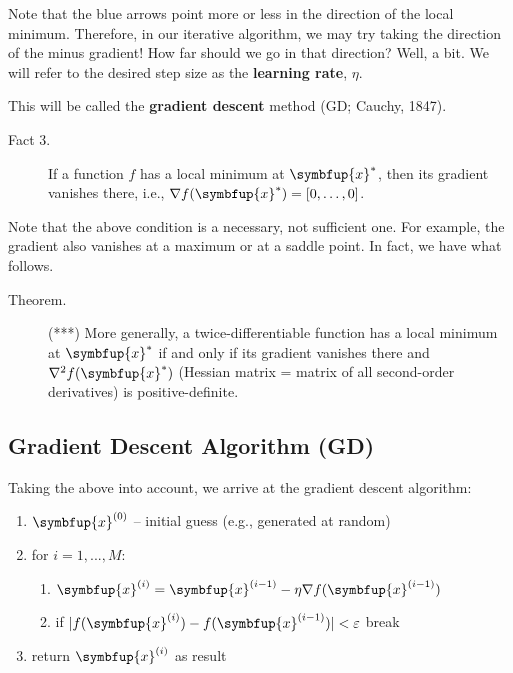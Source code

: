 \documentclass[10pt,b5paper,krantz1]{krantz}
\providecommand{\tightlist}{%
  \setlength{\itemsep}{0pt}\setlength{\parskip}{0pt}}
\renewcommand{\mathbf}[1]{\symbfup{#1}}
\begin{document}
Note that the blue arrows point more or less in the direction of the local minimum.
Therefore, in our iterative algorithm,
we may try taking the direction of the minus gradient!
How far should we go in that direction? Well, a bit.
We will refer to the desired step size as the \textbf{learning rate}, \(\eta\).

\bigskip

This will be called the \textbf{gradient descent} method (GD;
Cauchy, 1847).

\begin{description}
\item[Fact 3.]
If a function \(f\) has a local minimum at \(\mathbf{x}^*\),
then its gradient vanishes there, i.e.,
\(\nabla {f}(\mathbf{x}^*)=[0,\dots,0]\).
\end{description}

\bigskip

Note that the above condition is a necessary, not sufficient
one. For example, the gradient also vanishes at a maximum or
at a saddle point. In fact, we have what follows.

\begin{description}
\item[Theorem.]
(***) More generally, a twice-differentiable function
has a local minimum at \(\mathbf{x}^*\) if and only if
its gradient vanishes there and \(\nabla^2 {f}(\mathbf{x}^*)\)
(Hessian matrix = matrix of all second-order derivatives)
is positive-definite.
\end{description}

\hypertarget{gradient-descent-algorithm-gd}{%
\subsection{Gradient Descent Algorithm (GD)}\label{gradient-descent-algorithm-gd}}

Taking the above into account, we arrive at the gradient descent algorithm:

\begin{enumerate}
\def\labelenumi{\arabic{enumi}.}
\item
  \(\mathbf{x}^{(0)}\) -- initial guess (e.g., generated at random)
\item
  for \(i=1,...,M\):

  \begin{enumerate}
  \def\labelenumii{\alph{enumii}.}
  \tightlist
  \item
    \(\mathbf{x}^{(i)} = \mathbf{x}^{(i-1)}-\eta \nabla f(\mathbf{x}^{(i-1)})\)
  \item
    if \(|f(\mathbf{x}^{(i)})-f(\mathbf{x}^{(i-1)})| < \varepsilon\) break
  \end{enumerate}
\item
  return \(\mathbf{x}^{(i)}\) as result
\end{enumerate}
\end{document}
